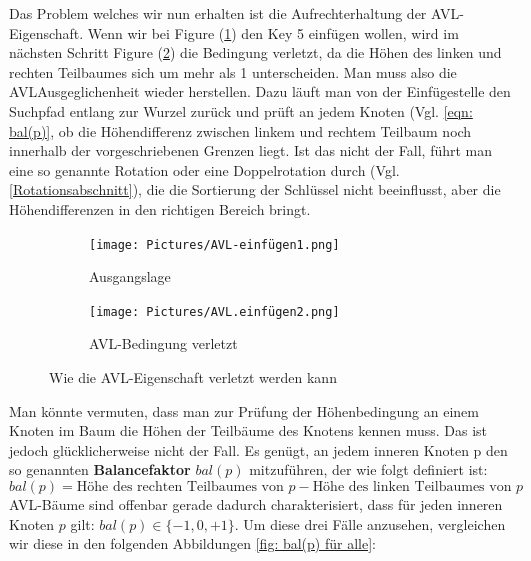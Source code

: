 \documentclass[a4paper]{article}
\begin{document}
Das Problem welches wir nun erhalten ist die Aufrechterhaltung der AVL-Eigenschaft. Wenn wir bei Figure (\ref{fig: AVL-ausgangslage}) den Key 5 einfügen wollen, wird im nächsten Schritt Figure (\ref{fig:AVL-verletzt}) die Bedingung verletzt, da die Höhen des linken und rechten Teilbaumes sich um mehr als 1 unterscheiden. Man muss also die AVLAusgeglichenheit wieder herstellen. Dazu läuft man von der Einfügestelle den Suchpfad entlang zur Wurzel zurück und prüft an jedem Knoten (Vgl. \ref{eqn: bal(p)}, ob die Höhendifferenz  zwischen linkem und rechtem Teilbaum noch innerhalb der vorgeschriebenen Grenzen liegt. Ist das nicht der Fall, führt man eine so genannte Rotation oder eine Doppelrotation durch (Vgl. \ref{Rotationsabschnitt}), die die Sortierung der Schlüssel nicht beeinflusst, aber die Höhendifferenzen in den richtigen Bereich bringt.
\begin{figure}[h] 
   \centering
     \begin{subfigure}[h]{0.5\textwidth}
         \centering
         \texttt{[image: Pictures/AVL-einfügen1.png]}
         \caption{Ausgangslage}
         \label{fig: AVL-ausgangslage}
     \end{subfigure}
     \hfill
     \begin{subfigure}[h]{0.45\textwidth}
         \centering
         \texttt{[image: Pictures/AVL.einfügen2.png]}         \caption{AVL-Bedingung verletzt}
         \label{fig:AVL-verletzt}
     \end{subfigure}
     \caption{Wie die AVL-Eigenschaft verletzt werden kann}
    \label{fig: AVL-ausgangslage-verletzt}
\end{figure}

Man könnte vermuten, dass man zur Prüfung der Höhenbedingung an einem Knoten
im Baum die Höhen der Teilbäume des Knotens kennen muss. Das ist jedoch glücklicherweise nicht der Fall. Es genügt, an jedem inneren Knoten p den so genannten \textbf{Balancefaktor} $bal(p)$ mitzuführen, der wie folgt definiert ist:
\begin{equation} \label{eqn: bal(p)}
    bal(p) = \text{Höhe des rechten Teilbaumes von } p - \text{Höhe des linken Teilbaumes von } p
\end{equation}
\newpage
AVL-Bäume sind offenbar gerade dadurch charakterisiert, dass für jeden inneren Knoten $p$ gilt: $bal(p) \in \{ -1, 0, +1\}$. Um diese drei Fälle anzusehen, vergleichen wir diese in den folgenden Abbildungen \ref{fig: bal(p) für alle}:
\end{document}
